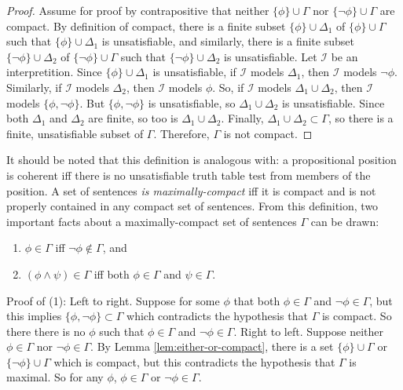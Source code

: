 \documentclass[12pt]{article}
\theoremstyle{definition}
\theoremstyle{remark}
\begin{document}
\begin{proof}
	Assume for proof by contrapositive that neither $\{ \phi \} \cup \Gamma$ nor $\{ \neg\phi \} \cup \Gamma$ are compact. By definition of compact, there is a finite subset $\{ \phi \} \cup \Delta_1$ of $\{ \phi \} \cup \Gamma $ such that $\{ \phi \} \cup \Delta_1$ is unsatisfiable, and similarly, there is a finite subset $\{ \neg\phi \} \cup \Delta_2$ of $\{ \neg\phi \} \cup \Gamma$ such that $\{ \neg\phi \} \cup \Delta_2$ is unsatisfiable. Let $\mathscr{I}$ be an interpretition. Since $\{ \phi \} \cup \Delta_1$ is unsatisfiable, if $\mathscr{I}$ models $\Delta_1$, then $\mathscr{I}$ models $\neg\phi$. Similarly, if $\mathscr{I}$ models $\Delta_2$, then $\mathscr{I}$ models $\phi$. So, if $\mathscr{I}$ models $\Delta_1 \cup \Delta_2$, then $\mathscr{I}$ models $\{ \phi, \neg\phi \}$. But $\{ \phi, \neg\phi \}$ is unsatisfiable, so $\Delta_1 \cup \Delta_2$ is unsatisfiable. Since both $\Delta_1$ and $\Delta_2$ are finite, so too is $\Delta_1 \cup \Delta_2$. Finally, $\Delta_1 \cup \Delta_2 \subset \Gamma$, so there is a finite, unsatisfiable subset of $\Gamma$. Therefore, $\Gamma$ is not compact.
\end{proof}

It should be noted that this definition is analogous with: a propositional position is coherent iff there is no unsatisfiable truth table test from members of the position. A set of sentences \textit{is maximally-compact} iff it is compact and is not properly contained in any compact set of sentences. From this definition, two important facts about a maximally-compact set of sentences $\Gamma$ can be drawn:

\begin{enumerate}
	\item[(1)] $\phi \in \Gamma$ iff $\neg\phi \not\in \Gamma$, and
	\item[(2)] $(\phi \land \psi) \in \Gamma$ iff both $\phi \in \Gamma$ and $\psi \in \Gamma$.
\end{enumerate}

Proof of (1): Left to right. Suppose for some $\phi$ that both $\phi \in \Gamma$ and $\neg\phi \in \Gamma$, but this implies $\{ \phi, \neg\phi \} \subset \Gamma$ which contradicts the hypothesis that $\Gamma$ is compact. So there there is no $\phi$ such that $\phi \in \Gamma$ and $\neg\phi \in \Gamma$. Right to left. Suppose neither $\phi \in \Gamma$ nor $\neg\phi \in \Gamma$. By Lemma \ref{lem:either-or-compact}, there is a set $\{ \phi \} \cup \Gamma$ or $\{ \neg\phi \} \cup \Gamma$ which is compact, but this contradicts the hypothesis that $\Gamma$ is maximal. So for any $\phi$, $\phi \in \Gamma$ or $\neg\phi \in \Gamma$.
\end{document}
